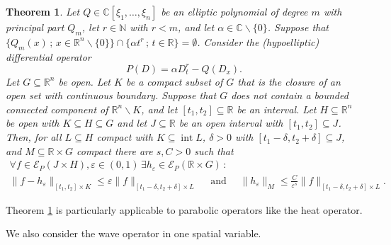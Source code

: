 \documentclass[12pt]{amsart}
\newcommand{\N}{\mathbb{N}}
\newcommand{\R}{\mathbb{R}}
\newcommand{\C}{\mathbb{C}}
\newtheorem{theorem}{Theorem}[section]
\theoremstyle{definition}
\theoremstyle{remark}
\numberwithin{equation}{section}
\begin{document}
\begin{theorem}\label{theo: quantitative parabolic}
	Let $Q\in\C[\xi_1,\ldots,\xi_n]$ be an elliptic polynomial of degree $m$ with principal part $Q_m$, let $r\in\N$ with $r<m$, and let $\alpha\in\C\backslash\{0\}$.
	Suppose that $\{ Q_m(x) \, ; \, x \in \R^n\backslash\{0\} \} \cap \{\alpha t^r\, ; \,t\in\R\} = \emptyset$. Consider the (hypoelliptic) differential operator
	$$P(D) = \alpha D^r_t -Q(D_x).$$
	Let $G\subseteq\R^n$ be open. Let $K$ be a compact subset of $G$ that is the closure of an open set with continuous boundary.
	Suppose  that $G$ does not contain a bounded connected component of $\R^n\backslash K$, and let $[t_1,t_2] \subseteq \R$ be an interval. Let $ H \subseteq \R^n$ be open with $K \subseteq H \subseteq G$ and let $J \subseteq \R$ be an open interval with $[t_1,t_2] \subseteq J$. Then, for all  $L \subseteq H$ compact with $K \subseteq \operatorname{int} L$, $\delta > 0$ with $[t_1-\delta,t_2+\delta]\subseteq J$,   and $M \subseteq \R \times G$ compact there are $s, C>0$ such that
	\begin{gather*} 
		\forall f\in\mathscr{E}_P(J \times H), \varepsilon\in (0,1) \,\exists h_\varepsilon \in\mathscr{E}_P(\R \times G) \, :\\ 
		\|f-h_\varepsilon\|_{[t_1,t_2] \times K}\leq \varepsilon\|f\|_{[t_1-\delta,t_2+\delta]\times L} \quad \mbox{ and } \quad \|h_\varepsilon\|_{M}\leq\frac{C}{\varepsilon^s}\|f\|_{[t_1-\delta,t_2+\delta]\times L}.
	\end{gather*}
\end{theorem}

\noindent Theorem \ref{theo: quantitative parabolic} is particularly applicable to parabolic operators like the heat operator.

We also consider the wave operator in one spatial variable. 
\end{document}

